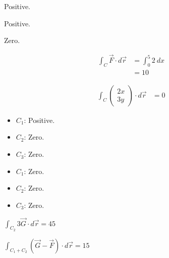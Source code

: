 \documentclass[8pt]{extarticle}
\title{}
\author{}
\date{}
\begin{document}
  \begin{problem}{18.1}
    \begin{description}[font=\normalfont]
      \item[2:] Positive.
      \item[4:] Positive.
      \item[6:] Zero.
      \item[8:]
        \begin{align*}
          \int_{C}\vec{F}\cdot d\vec{r} &= \int_{0}^{5} 2~dx\\
                                        &= 10
        \end{align*}
      \item[20:]
        \begin{align*}
          \int_{C} \begin{pmatrix}2x\\3y\end{pmatrix}\cdot d\vec{r} &= 0
        \end{align*}
      \item[28:]\hfill
        \begin{itemize}
          \item $C_1$: Positive.
          \item $C_2$: Zero.
          \item $C_3$: Zero.
        \end{itemize}
      \item[30:]\hfill
        \begin{itemize}
          \item $C_1$: Zero.
          \item $C_2$: Zero.
          \item $C_3$: Zero.
        \end{itemize}
      \item[48:] $\int_{C_2}3\vec{G}\cdot d\vec{r} = 45$
      \item[50:] $\int_{C_1 + C_2}(\vec{G}-\vec{F})\cdot d\vec{r} = 15$
    \end{description}
  \end{problem}
\end{document}
